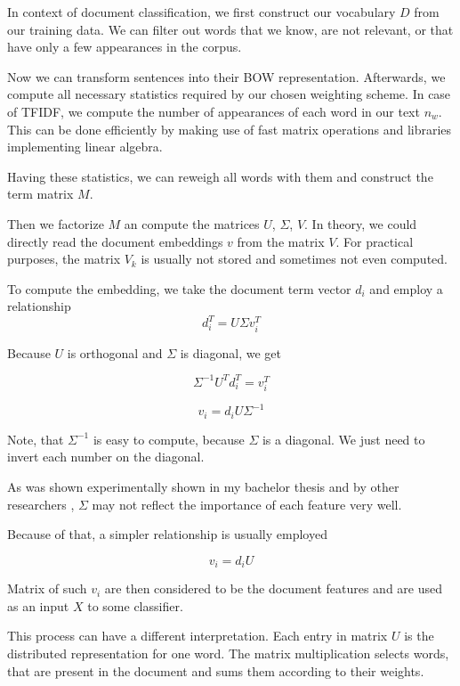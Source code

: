     In context of document classification, we first construct our vocabulary $D$ from our training data. 
    We can filter out words that we know, are not relevant, or that have only a few appearances in the corpus.
    
    Now we can transform sentences into their BOW representation.
    Afterwards, we compute all necessary statistics required by our chosen weighting scheme. 
    In case of TFIDF, we compute the number of appearances of each word in our text $n_w$. 
    This can be done efficiently by making use of fast matrix operations and libraries implementing linear algebra.
    
    Having these statistics, we can reweigh all words with them and construct the term matrix $M$.
    
    Then we factorize $M$ an compute the matrices $U$, $\Sigma$, $V$. 
    In theory, we could directly read the document embeddings $v$ from the matrix $V$.
    For practical purposes, the matrix $V_k$ is usually not stored and sometimes not even computed. 
    
    To compute the embedding, we take the document term vector $d_i$ and employ a relationship $$d_i^T = U \Sigma v_i^T$$
    
    Because $U$ is orthogonal and $\Sigma$ is diagonal, we get
    
    $$\Sigma^{-1} U^T d_i^T = v_i^T $$

    $$v_i = d_i U \Sigma^{-1} $$
    
    Note, that $\Sigma^{-1}$ is easy to compute, because $\Sigma$ is a diagonal. 
    We just need to invert each number on the diagonal.  
    
    As was shown experimentally shown in my bachelor thesis \cite{macko2016} 
    and by other researchers \cite{levy2015improving}, $\Sigma$ may not reflect the importance of each feature very well.
    
    Because of that, a simpler relationship is usually employed
    
    $$v_i = d_i U $$
    
    Matrix of such $v_i$ are then considered to be the document features and are used as an input $X$ to some classifier.
    
    This process can have a different interpretation.
    Each entry in matrix $U$ is the distributed representation for one word.
    The matrix multiplication selects words, that are present in the document and sums them according to their weights.
    
